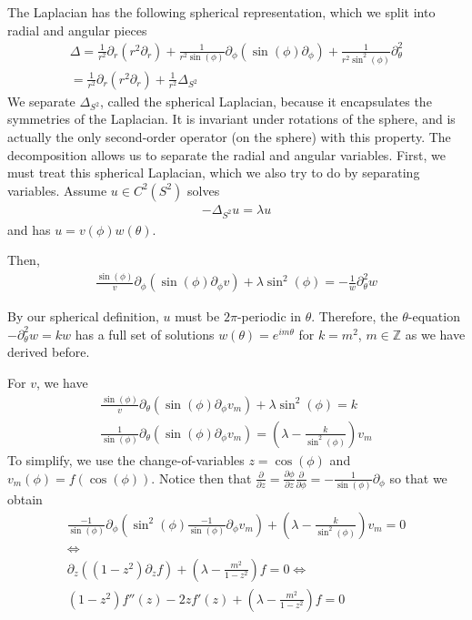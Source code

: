 \documentclass{article}
\newcommand{\Z}{{\mathbb{Z}}}
\newcommand{\pd}{\partial}
\begin{document}
	The Laplacian has the following spherical representation, which we split into radial and angular pieces
	\begin{align*}
		\Delta = \frac{1}{r^{2}} \pd_{r} (r^{2} \pd_{r}) + \frac{1}{r^{2}\sin(\phi)} \pd_{\phi}(\sin(\phi)\pd_{\phi}) + \frac{1}{r^{2}\sin^{2}(\phi)} \pd_{\theta}^{2} \\
		= \frac{1}{r^{2}} \pd_{r} (r^{2} \pd_{r}) + \frac{1}{r^{2}} \Delta_{S^{2}}
	\end{align*} 
	We separate $\Delta_{S^{2}}$, called the spherical Laplacian, because it encapsulates the symmetries of the Laplacian. It is invariant under rotations of the sphere, and is actually the only second-order operator (on the sphere) with this property. The decomposition allows us to separate the radial and angular variables. First, we must treat this spherical Laplacian, which we also try to do by separating variables. Assume $u \in C^{2}(S^{2})$ solves 
	\begin{align*}
		-\Delta_{S^{2}}u = \lambda u
	\end{align*}
	and has $u = v(\phi) w(\theta)$. 
	
	Then,
	\begin{align*}
		\frac{\sin(\phi)}{v} \pd_{\phi} (\sin(\phi) \pd_{\phi} v) + \lambda\sin^{2}(\phi) = -\frac{1}{w} \pd_{\theta}^{2} w
	\end{align*}
	
	By our spherical definition, $u$ must be $2\pi$-periodic in $\theta$. Therefore, the $\theta$-equation $-\pd_{\theta}^{2}w = kw$ has a full set of solutions $w(\theta) = e^{i m \theta}$ for $k = m^{2}$, $m \in \Z$ as we have derived before. 
	
	For $v$, we have 
	\begin{align*}
		\frac{\sin(\phi)}{v} \pd_{\theta} (\sin(\phi) \pd_{\phi} v_{m}) + \lambda\sin^{2}(\phi)  = k \\
		\frac{1}{\sin(\phi)} \pd_{\theta} (\sin(\phi) \pd_{\phi} v_{m}) = (\lambda - \frac{k}{\sin^{2}(\phi)})v_{m}
	\end{align*}
	To simplify, we use the change-of-variables $z = \cos(\phi)$ and $v_{m}(\phi) = f(\cos(\phi))$. Notice then that $\frac{\pd}{\pd z} = \frac{\pd \phi}{\pd z} \frac{\pd}{\pd \phi} = -\frac{1}{\sin(\phi)} \pd_{\phi}$ so that we obtain
	\begin{align*}
		\frac{-1}{\sin(\phi)}  \pd_{\phi} ( \sin^{2}(\phi) \frac{-1}{\sin(\phi)}\pd_{\phi} v_{m}) + (\lambda - \frac{k}{\sin^{2}(\phi)})v_{m}=0 \\
		\Leftrightarrow \\
		\pd_{z}((1-z^{2})\pd_{z} f) + \left(\lambda - \frac{m^{2}}{1-z^{2}}\right)f = 0
		\Leftrightarrow \\
		(1-z^{2})f''(z) - 2zf'(z) + \left(\lambda - \frac{m^{2}}{1-z^{2}}\right)f=0
	\end{align*}
	
\end{document}

